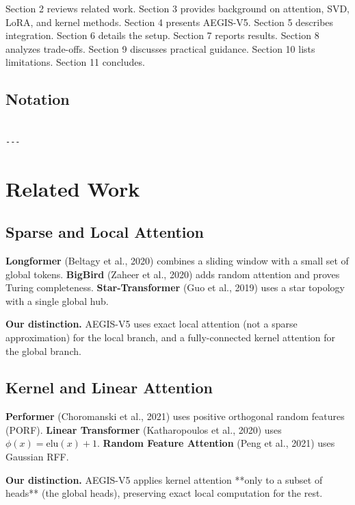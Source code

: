 Section 2 reviews related work. Section 3 provides background on attention, 
SVD, LoRA, and kernel methods. Section 4 presents AEGIS-V5. Section 5 
describes integration. Section 6 details the setup. Section 7 reports 
results. Section 8 analyzes trade-offs. Section 9 discusses practical 
guidance. Section 10 lists limitations. Section 11 concludes.



\subsection{Notation}

\begin{lstlisting}

---
\end{lstlisting}

\section{Related Work}

\subsection{Sparse and Local Attention}

\textbf{Longformer} (Beltagy et al., 2020) combines a sliding window with a small 
set of global tokens. \textbf{BigBird} (Zaheer et al., 2020) adds random 
attention and proves Turing completeness. \textbf{Star-Transformer} (Guo et al., 
2019) uses a star topology with a single global hub.

\textbf{Our distinction.} AEGIS-V5 uses exact local attention (not a sparse 
approximation) for the local branch, and a fully-connected kernel 
attention for the global branch.

\subsection{Kernel and Linear Attention}

\textbf{Performer} (Choromanski et al., 2021) uses positive orthogonal random 
features (PORF). \textbf{Linear Transformer} (Katharopoulos et al., 2020) uses 
$\phi(x) = \text{elu}(x) + 1$. \textbf{Random Feature Attention} (Peng et al., 
2021) uses Gaussian RFF.

\textbf{Our distinction.} AEGIS-V5 applies kernel attention **only to a subset 
of heads** (the global heads), preserving exact local computation for the 
rest.

